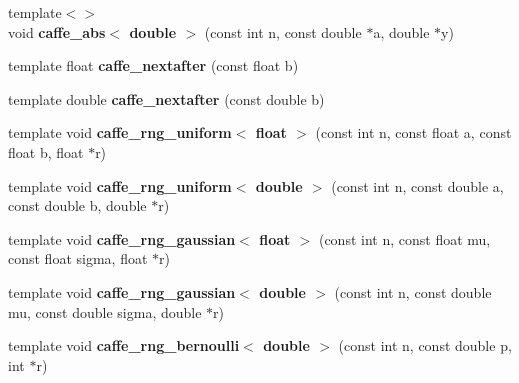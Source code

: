 \begin{DoxyCompactItemize}
\item 
{\footnotesize template$<$$>$ }\\void {\bfseries caffe\+\_\+abs$<$ double $>$} (const int n, const double $\ast$a, double $\ast$y)\hypertarget{namespacecaffe_ad108436357496f5f3469efdfa435ced7}{}\label{namespacecaffe_ad108436357496f5f3469efdfa435ced7}

\item 
template float {\bfseries caffe\+\_\+nextafter} (const float b)\hypertarget{namespacecaffe_a15b19ccf3032875f3963dc45bdca5b58}{}\label{namespacecaffe_a15b19ccf3032875f3963dc45bdca5b58}

\item 
template double {\bfseries caffe\+\_\+nextafter} (const double b)\hypertarget{namespacecaffe_aa0ed3e47a272cc59fbf35d315a06cff5}{}\label{namespacecaffe_aa0ed3e47a272cc59fbf35d315a06cff5}

\item 
template void {\bfseries caffe\+\_\+rng\+\_\+uniform$<$ float $>$} (const int n, const float a, const float b, float $\ast$r)\hypertarget{namespacecaffe_a847ecc499532e6db9ad63f3c6bc12bfb}{}\label{namespacecaffe_a847ecc499532e6db9ad63f3c6bc12bfb}

\item 
template void {\bfseries caffe\+\_\+rng\+\_\+uniform$<$ double $>$} (const int n, const double a, const double b, double $\ast$r)\hypertarget{namespacecaffe_a8c4bdf8dedd6900827a2786a51fc51ff}{}\label{namespacecaffe_a8c4bdf8dedd6900827a2786a51fc51ff}

\item 
template void {\bfseries caffe\+\_\+rng\+\_\+gaussian$<$ float $>$} (const int n, const float mu, const float sigma, float $\ast$r)\hypertarget{namespacecaffe_a651fc6ba95e1d724fb83944da736b72f}{}\label{namespacecaffe_a651fc6ba95e1d724fb83944da736b72f}

\item 
template void {\bfseries caffe\+\_\+rng\+\_\+gaussian$<$ double $>$} (const int n, const double mu, const double sigma, double $\ast$r)\hypertarget{namespacecaffe_a1d49416846c39cc87283957ee159d7a9}{}\label{namespacecaffe_a1d49416846c39cc87283957ee159d7a9}

\item 
template void {\bfseries caffe\+\_\+rng\+\_\+bernoulli$<$ double $>$} (const int n, const double p, int $\ast$r)\hypertarget{namespacecaffe_aa4918edaa352d82ee01343ee08c96797}{}\label{namespacecaffe_aa4918edaa352d82ee01343ee08c96797}


\end{DoxyCompactItemize}
